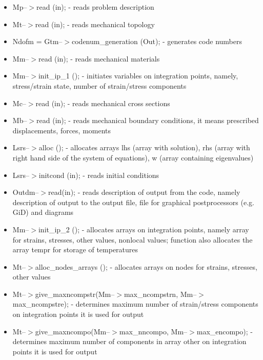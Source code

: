 \begin{itemize}
\item
Mp--$>$read (in); - reads problem description

\item
Mt--$>$read (in); - reads mechanical topology

\item
Ndofm = Gtm--$>$codenum\_generation (Out); - generates code numbers

\item
Mm--$>$read (in); - reads mechanical materials
	
\item
Mm--$>$init\_ip\_1 (); - initiates variables on integration points, namely, stress/strain state,
number of strain/stress components

\item
Mc--$>$read (in); - reads mechanical cross sections

\item
Mb--$>$read (in); - reads mechanical boundary conditions, it means
prescribed displacements, forces, moments

\item
Lsrs--$>$alloc (); - allocates arrays lhs (array with solution),
rhs (array with right hand side of the system of equations),
w (array containing eigenvalues)
 
\item
Lsrs--$>$initcond (in); - reads initial conditions

\item
Outdm--$>$read(in); - reads description of output from the code, namely description
of output to the output file, file for graphical postprocessors (e.g. GiD) and
diagrams

\item
Mm--$>$init\_ip\_2 (); - allocates arrays on integration points, namely array
for strains, stresses, other values, nonlocal values;
function also allocates the array tempr for storage of temperatures

\item
Mt--$>$alloc\_nodes\_arrays (); - allocates arrays on nodes for
strains, stresses, other values

\item
Mt--$>$give\_maxncompstr(Mm--$>$max\_ncompstrn, Mm--$>$max\_ncompstre); - determines
maximum number of strain/stress components on integration points
it is used for output

\item
Mt--$>$give\_maxncompo(Mm--$>$max\_nncompo, Mm--$>$max\_encompo); - determines
maximum number of components in array other on integration points
it is used for output


\end{itemize}
